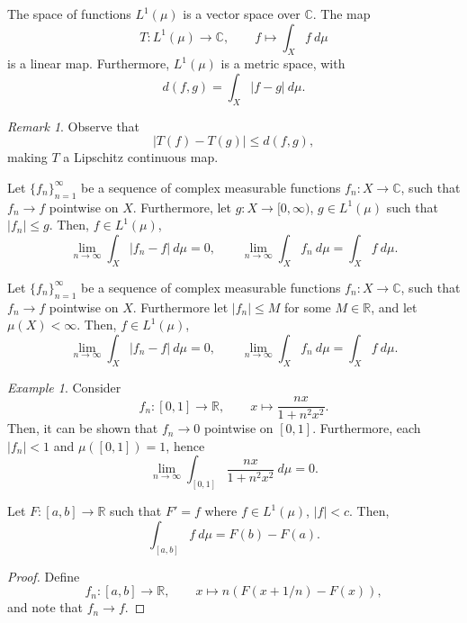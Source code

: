 \documentclass[11pt]{article}
\newcommand{\C}{\mathbb{C}}
\newcommand{\R}{\mathbb{R}}
\theoremstyle{definition}
\theoremstyle{remark}
\newtheorem*{remark}{Remark}
\newtheorem*{example}{Example}
\numberwithin{equation}{section}
\begin{document}
    \begin{theorem}
        The space of functions $L^1(\mu)$ is a vector space over $\C$.
        The map \[
            T\colon L^1(\mu) \to \C, \qquad f \mapsto \int_X f\:d\mu
        \] is a linear map. Furthermore, $L^1(\mu)$ is a metric space, with \[
            d(f, g) = \int_X |f - g|\:d\mu.
        \]
        \begin{remark}
            Observe that \[
                |T(f) - T(g)| \leq d(f, g),
            \] making $T$ a Lipschitz continuous map.
        \end{remark}
    \end{theorem}


    \begin{theorem}
        Let $\{f_n\}_{n = 1}^\infty$ be a sequence of complex measurable functions
        $f_n\colon X \to \C$, such that $f_n \to f$ pointwise on $X$. Furthermore,
        let $g\colon X \to [0, \infty)$, $g \in L^1(\mu)$ such that $|f_n| \leq g$.
        Then, $f \in L^1(\mu)$, \[
            \lim_{n \to \infty} \int_X |f_n - f| \:d\mu = 0, \qquad
            \lim_{n \to \infty} \int_X f_n \:d\mu = \int_X f \:d\mu.
        \]
    \end{theorem}

    \begin{corollary}
        Let $\{f_n\}_{n = 1}^\infty$ be a sequence of complex measurable functions
        $f_n\colon X \to \C$, such that $f_n \to f$ pointwise on $X$.
        Furthermore let $|f_n| \leq M$ for some $M \in \R$, and let $\mu(X) <
        \infty$. Then, $f \in L^1(\mu)$, \[
            \lim_{n \to \infty} \int_X |f_n - f| \:d\mu = 0, \qquad
            \lim_{n \to \infty} \int_X f_n \:d\mu = \int_X f \:d\mu.
        \]
    \end{corollary}

    \begin{example}
        Consider \[
            f_n \colon [0, 1] \to \R, \qquad x \mapsto \frac{nx}{1 + n^2x^2}.
        \] Then, it can be shown that $f_n \to 0$ pointwise on $[0, 1]$. Furthermore,
        each $|f_n| < 1$ and $\mu([0, 1]) = 1$, hence \[
            \lim_{n \to \infty} \int_{[0, 1]} \frac{nx}{1 + n^2x^2}\:d\mu = 0.
        \]
    \end{example}


    \begin{theorem}
        Let $F\colon [a, b] \to \R$ such that $F' = f$ where $f \in L^1(\mu)$, $|f| <
        c$. Then, \[
            \int_{[a, b]} f \:d\mu = F(b) - F(a).
        \]
    \end{theorem}
    \begin{proof}
        Define \[
            f_n\colon [a, b] \to \R, \qquad x \mapsto n(F(x + 1 / n) - F(x)),
        \] and note that $f_n \to f$.
    \end{proof}
\end{document}

